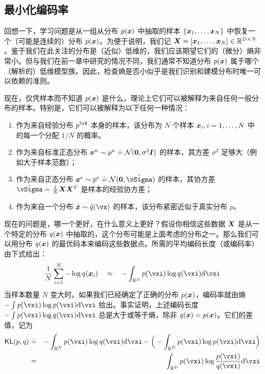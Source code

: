 \documentclass[../../book-main_zh.tex]{subfiles}
\begin{document}
\subsection{最小化编码率}\label{sub:min_entropy}
回想一下，学习问题是从一组从分布 $p(\bm{x})$ 中抽取的样本 $\{\bm{x}_1, \ldots, \bm{x}_N\}$ 中恢复一个（可能是连续的）分布 $p(\bm{x})$。为便于说明，我们记 $\bm{X} = [\bm{x}_1, \ldots, \bm{x}_N] \in \mathbb{R}^{D\times N}$。鉴于我们在此关注的分布是（近似）低维的，我们应该期望它们的（微分）熵非常小。但与我们在前一章中研究的情况不同，我们通常不知道分布 $p(\bm{x})$ 属于哪个（解析的）低维模型族。因此，检查熵是否小似乎是我们识别和建模分布时唯一可以依赖的准则。

现在，仅凭样本而不知道 $p(\bm{x})$ 是什么，理论上它们可以被解释为来自任何一般分布的样本。特别是，它们可以被解释为以下任何一种情况：
\begin{enumerate}
	\item 作为来自经验分布 $p^{\vX}$ 本身的样本，该分布为 $N$ 个样本 $\bm{x}_i, i=1, \ldots, N$ 中的每一个分配 $1/N$ 的概率。
	\item 作为来自标准正态分布 $\bm{x}^n \sim p^{n} \doteq \mathcal{N}(\boldsymbol{0}, \sigma^2 \boldsymbol{I})$ 的样本，其方差 $\sigma^2$ 足够大（例如大于样本范数）；
	\item 作为来自正态分布 $\x^e \sim p^{e} \doteq \mathcal{N}(\boldsymbol{0}, \hat{\vSigma})$ 的样本，其协方差 $\hat{\vSigma} = \frac{1}{N} \X \X^T$ 是样本的经验协方差；
	\item 作为来自一个分布 $\hat \x \sim \hat{q}(\vx)$ 的样本，该分布紧密近似于真实分布 $p$。
\end{enumerate}
现在的问题是，哪一个更好，在什么意义上更好？假设你相信这些数据 $\bm{X}$ 是从一个特定的分布 $q(\bm{x})$ 中抽取的，这个分布可能是上面考虑的分布之一。那么我们可以用分布 $q(\bm{x})$ 的最优码本来编码这些数据点。所需的平均编码长度（或编码率）由下式给出：
\begin{equation}
	\frac{1}{N}\sum_{i=1}^N -\log q(\x_i) \quad \approx \quad - \int_{\R^{D}} p(\vxi) \log q(\vxi)\odif{\vxi}
\end{equation}
当样本数量 $N$ 变大时。如果我们已经确定了正确的分布 $p(\bm{x})$，编码率就由熵 $- \int p(\vxi) \log p(\vxi) \odif{\vxi}$ 给出。事实证明，上述编码长度 $- \int p(\vxi) \log q(\vxi) \odif{\vxi}$ 总是大于或等于熵，除非 $q(\bm{x}) = p(\bm{x})$。它们的差值，记为
\begin{eqnarray}
	\KL(p, q) &\doteq& - \int_{\R^{D}} p(\vxi) \log q(\vxi) \odif{\vxi}  - \Big(- \int_{\R^{D}} p(\vxi) \log p(\vxi) \odif{\vxi} \Big)\\
	&=& \int_{\R^{D}} p(\vxi) \log \frac{p(\vxi)}{q(\vxi)} \odif{\vxi}
\end{eqnarray}
\end{document}

